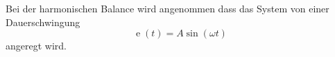 Bei der harmonischen Balance wird angenommen dass das System von einer Dauerschwingung
$$\operatorname{e}(t) = A \sin(\omega t)$$ 
angeregt wird.
